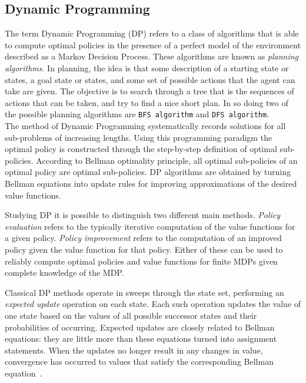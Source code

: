 \subsection{Dynamic Programming} The term Dynamic Programming (DP) refers to a class of algorithms that is able to compute optimal policies in the presence of a perfect model of the environment described as a Markov Decision Process. These algorithms are known as \textit{planning algorithms}. In planning, the idea is that some description of a starting state or states, a goal state or states, and some set of possible actions that the agent can take are given. The objective is to search through a tree that is the sequences of actions that can be taken, and try to find a nice short plan. In so doing two of the possible planning algorithms are {\tt BFS algorithm} and {\tt DFS algorithm}. \\

The method of Dynamic Programming systematically records solutions for all sub-problems of increasing lengths. Using this programming paradigm the optimal policy is constructed through the step-by-step definition of optimal sub-policies. According to Bellman optimality principle, all optimal sub-policies of an optimal policy are optimal sub-policies. DP algorithms are obtained by turning Bellman equations into update rules for improving approximations of the desired value functions.

Studying DP it is possible to distinguish two different main methods. \textit{Policy evaluation} refers to the typically iterative computation of the value functions for a given policy. \textit{Policy improvement} refers to the computation of an improved policy given the value function for that policy. Either of these can be used to reliably compute optimal policies and value functions for finite MDPs given complete knowledge of the MDP.


Classical DP methods operate in sweeps through the state set, performing an \textit{expected update} operation on each state. Each such operation updates the value of one state based on the values of all possible successor states and their probabilities of occurring. Expected updates are closely related to Bellman equations: they are little more than these equations turned into assignment statements. When the updates no longer result in any changes in value, convergence has occurred to values that satisfy the corresponding Bellman equation~\cite{SuttonBarto}. \\

